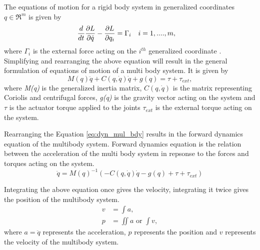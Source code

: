 The equations of motion for a rigid body system in generalized coordinates $q \in \Re^m $ is given by
\begin{align}
\label{eq:lagrange}
\frac{d}{dt} &\frac{\partial {L}}{\partial {\dot{q}}} - \frac{\partial {L}}{\partial {q_i}} = \Gamma_i && i=1,....,m,
\end{align}
where $\Gamma_i$ is the external force acting on the $i^{th}$ generalized coordinate \cite[Chapter 4]{mur94}.
Simplifying and rearranging the above equation will result in the general formulation of equations of motion of a multi body system. It is given by
\begin{equation}
\label{eq:dyn_mul_bdy}
M(q)\ddot{q}+C(q,\dot{q})\dot{q}+g(q) = \tau + \tau_{ext},
\end{equation}
where \emph{M(q)} is the generalized inertia matrix, $C(q,\dot{q})$ is the matrix representing Coriolis and centrifugal forces, \emph{g(q)} is the gravity vector acting on the system and $\tau$ is the actuator torque applied to the joints $\tau_{ext}$ is the external torque acting on the system.

Rearranging the Equation \ref{eq:dyn_mul_bdy} results in the forward dynamics equation of the multibody system. Forward dynamics equation is the relation between the acceleration of the multi body system in repsonse to the forces and torques acting on the system.
\begin{equation}
    \label{eq:fwdyn}
    \ddot{q} = M(q)^{-1} (- C(q,\dot{q})\dot{q} -g(q) + \tau + \tau_{ext})
\end{equation}

Integrating the above equation once gives the velocity, integrating it twice gives the position of the multibody system. 
$$ \begin{aligned} 
    v &= \int a ,\\ 
    p &=  \iint a \text{ or } \int v , 
    \end{aligned}$$ where $a = \ddot{q}$ represents the acceleration, $p$ represents the position and $v$ represents the velocity of the multibody system.

